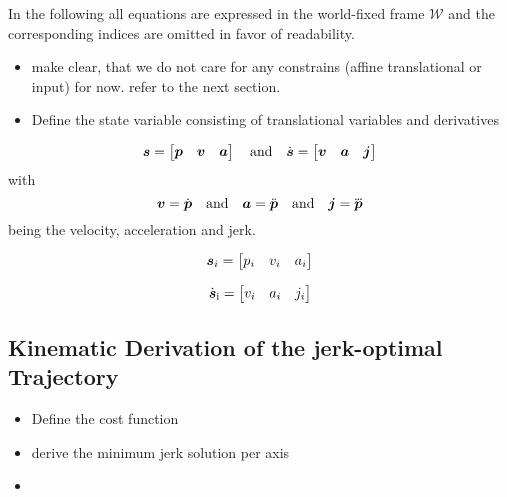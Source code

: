 In the following all equations are expressed in the world-fixed frame $\mathcal{W}$ and the corresponding indices are omitted in favor of readability.

\begin{itemize}
	\color{red}
	\item make clear, that we do not care for any constrains (affine translational or input) for now. refer to the next section.
	\item Define the state variable consisting of translational variables and derivatives
\end{itemize}


\begin{equation}
	\label{eq:trajectory-state}
	\mbox{$\bm{s}$} = 
	\begin{bmatrix}
		\mbox{$\bm{p}$} & \mbox{$\bm{v}$} & \mbox{$\bm{a}$}	
	\end{bmatrix}
	\quad
	\text{and}
	\quad
	\mbox{$\dot{\bm{s}}$} =
	\begin{bmatrix}
		\mbox{$\bm{v}$} &
		\mbox{$\bm{a}$} &
		\mbox{$\bm{j}$}
	\end{bmatrix}
\end{equation}
with
\begin{equation}
	\mbox{$\bm{v}$} = \mbox{$\dot{\bm{p}}$}
	\quad
	\text{and}
	\quad
	\mbox{$\bm{a}$} = \mbox{$\ddot{\bm{p}}$}
	\quad
	\text{and}
	\quad
	\mbox{$\bm{j}$} = \mbox{$\dddot{\bm{p}}$}
\end{equation}
being the velocity, acceleration and jerk.

\begin{equation}
	\label{eq:trajectory-state-per-axis}
	\mbox{$\bm{s}$}_{i} =
	\begin{bmatrix}
		p_{i} &
		v_{i} &
		a_{i}
	\end{bmatrix}
\end{equation}

\begin{equation}
	\label{eq:trajectory-state-derivative-per-axis}
	\mbox{$\dot{\bm{s}}$}_\text{i} =
	\begin{bmatrix}
		v_{i} &
		a_{i} &
		j_{i}
	\end{bmatrix}
\end{equation}

\subsection{Kinematic Derivation of the jerk-optimal Trajectory}
\begin{itemize}
	\color{red}
	\item Define the cost function
	\item derive the minimum jerk solution per axis
	\item 
\end{itemize}

